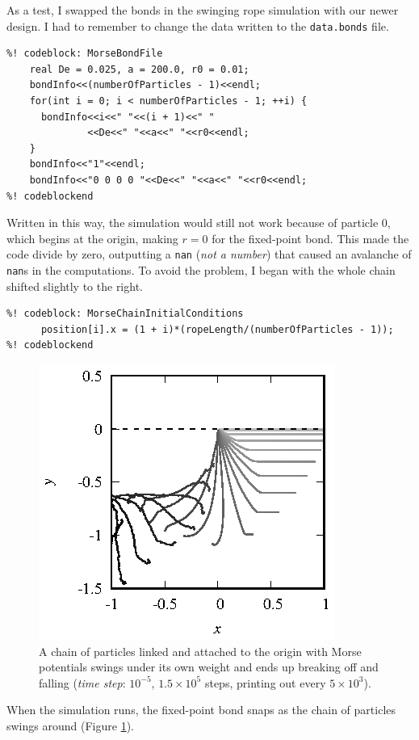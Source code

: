 As a test, I swapped the bonds in the swinging rope simulation with our newer 
design. I had to remember to change the data written to the \texttt{data.bonds} 
file.
\begin{lstlisting}
%! codeblock: MorseBondFile
    real De = 0.025, a = 200.0, r0 = 0.01;
    bondInfo<<(numberOfParticles - 1)<<endl;
    for(int i = 0; i < numberOfParticles - 1; ++i) {
      bondInfo<<i<<" "<<(i + 1)<<" "
              <<De<<" "<<a<<" "<<r0<<endl;
    }
    bondInfo<<"1"<<endl;
    bondInfo<<"0 0 0 0 "<<De<<" "<<a<<" "<<r0<<endl;
%! codeblockend
\end{lstlisting}
Written in this way, the simulation would still not work because of particle 
$0$, which begins at the origin, making $r = 0$ for the fixed-point bond. This
made the code divide by zero, outputting a \texttt{nan} (\textit{not a number})
that caused an avalanche of \texttt{nan}s in the computations. To avoid the
problem, I began with the whole chain shifted slightly to the right.
\begin{lstlisting}
%! codeblock: MorseChainInitialConditions
      position[i].x = (1 + i)*(ropeLength/(numberOfParticles - 1));
%! codeblockend
\end{lstlisting}

\begin{figure}
  \centering
  \includegraphics[width = 0.6 \textwidth]{figures/MorseChain.eps}
  \caption{\label{MorseChain} A chain of particles linked and attached to the 
           origin with Morse potentials swings under its own weight and ends up 
           breaking off and falling (\textit{time step}: $10^{-5}$, 
           $1.5 \times 10^5$ steps, printing out every $5 \times 10^3$).}
\end{figure}

When the simulation runs, the fixed-point bond snaps as the chain of particles
swings around (Figure \ref{MorseChain}). 

